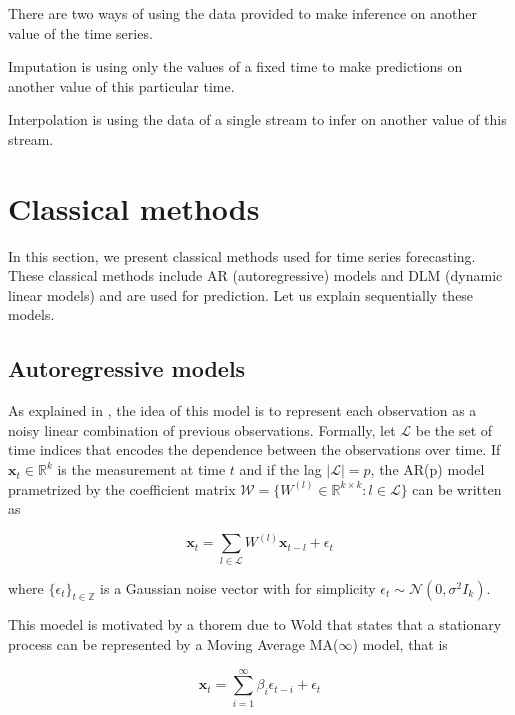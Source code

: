 \documentclass{article}
\begin{document}
There are two ways of using the data provided to make inference on another value of the time series.
\begin{definition}{Imputation}
is using only the values of a fixed time to make predictions on another value of this particular time.
\end{definition}

\begin{definition}{Interpolation}
 is using the data of a single stream to infer on another value of this stream.
\end{definition}

\section{Classical methods}
\label{clas}
In this section, we present classical methods used for time series forecasting.
These classical methods include AR (autoregressive) models and DLM (dynamic linear models) and are used for prediction.
Let us explain sequentially these models.

\subsection*{Autoregressive models}
As explained in \cite{pmlr-v37-anava15}, the idea of this model is to represent each observation as a noisy linear combination of previous observations.
Formally, let $\mathcal{L}$ be the set of time indices that encodes the dependence between the observations over time. If $\mathbf{x}_t \in \mathbb{R}^k$ is the measurement at time $t$ and if the lag $|\mathcal{L}| = p$, the AR(p) model prametrized by the coefficient matrix $\mathcal{W} = \{W^{(l)} \in \mathbb{R}^{k \times k} : l \in \mathcal{L} \}$ can be written as

\begin{equation}
\mathbf{x}_t = \sum_{l \in \mathcal{L}} W^{(l)} \mathbf{x}_{t-l} + \epsilon_t
\label{eq:ar}
\end{equation}

where $\{ \epsilon_t \}_{t \in \mathbb{Z}}$ is a Gaussian noise vector with for simplicity $\epsilon_t \sim \mathcal{N}(0, \sigma^2 I_k)$.

This moedel is motivated by a thorem due to Wold that states that a stationary process can be represented by a Moving Average MA($\infty$) model, that is

$$\mathbf{x}_t = \sum_{i=1}^{\infty} \beta_i \epsilon_{t-i} + \epsilon_t$$
\end{document}
